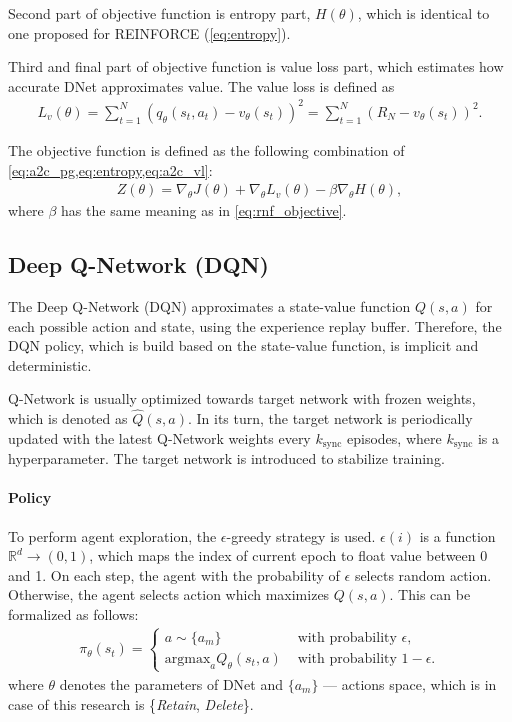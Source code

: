 \documentclass{article}
\begin{document}
Second part of objective function is entropy part, $H(\theta)$, which is
identical to one proposed for REINFORCE (\cref{eq:entropy}).

Third and final part of objective function is value loss part, which estimates
how accurate DNet approximates value. The value loss is defined as
\begin{align}
  \label{eq:a2c_vl}
  L_v(\theta)
  =\sum^N_{t=1} {(q_{\theta}(s_t, a_t) - v_{\theta}(s_t))}^2
  = \sum^N_{t=1} {(R_N- v_\theta(s_t))}^2.
\end{align}

The objective function is defined as the following combination of
\cref{eq:a2c_pg,eq:entropy,eq:a2c_vl}:
\begin{align}
  \label{eq:a2c_objective}
  Z(\theta) = \nabla_\theta J(\theta) +
  \nabla_\theta L_v(\theta) - \beta \nabla_\theta H(\theta),
\end{align}
where $\beta$ has the same meaning as in \cref{eq:rnf_objective}.


\subsection{Deep Q-Network (DQN)}\label{subsubsec:dqn}

The Deep Q-Network (DQN) approximates a state-value function $Q(s, a)$ for each
possible action and state, using the experience replay buffer. Therefore, the
DQN policy, which is build based on the state-value function, is implicit and
deterministic.

Q-Network is usually optimized towards target network with frozen weights,
which is denoted as $\hat{Q}(s, a)$. In its turn, the target network is
periodically updated with the latest Q-Network weights every $k_\text{sync}$
episodes, where $k_\text{sync}$ is a hyperparameter. The target network is
introduced to stabilize training.

\paragraph{Policy}
To perform agent exploration, the $\epsilon$-greedy strategy is used.
$\epsilon(i)$ is a function $\mathbb{R}^d \rightarrow (0, 1)$, which maps the
index of current epoch to float value between 0 and 1. On each step, the agent
with the probability of $\epsilon$ selects random action. Otherwise, the agent
selects action which maximizes $Q(s, a)$. This can be formalized as follows:
\begin{align}
  \label{eq:dqn_policy}
  \pi_{\theta}(s_t) =
  \begin{cases}
    a \sim \{a_m\}                  & \text{ with probability } \epsilon,     \\
    \text{argmax}_a Q_\theta(s_t,a) & \text{ with probability } 1 - \epsilon.
  \end{cases}
\end{align}
where $\theta$
denotes the parameters of DNet and
$\{a_m\}$ --- actions space,
which is in case of this research is \{\textit{Retain}, \textit{Delete}\}.
\end{document}
